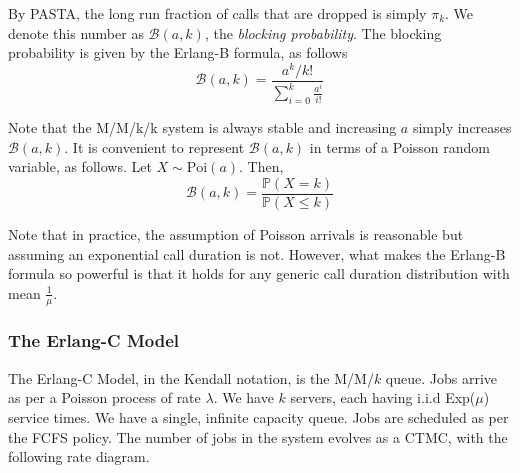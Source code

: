 \documentclass[12pt]{article}
\def\P{\mathbb{P}}
\def\ddfrac#1#2{\displaystyle\frac{\displaystyle #1}{\displaystyle #2}}
\theoremstyle{definition}
\begin{document}
By PASTA, the long run fraction of calls that are dropped is simply $\pi_k$. We denote this number as $\mathcal{B}(a,k)$, the \emph{blocking probability}. The blocking probability is given by the Erlang-B formula, as follows
\[
    \boxed{\mathcal{B}(a,k) = \ddfrac{a^k/k!}{\sum_{i=0}^k \frac{a^i}{i!}}}
\]

Note that the M/M/k/k system is always stable and increasing $a$ simply increases $\mathcal{B}(a,k)$. It is convenient to represent $\mathcal{B}(a,k)$ in terms of a Poisson random variable, as follows. Let $X \sim \text{Poi}(a)$. Then, 
\[
    \mathcal{B}(a,k) = \frac{\P(X = k)}{\P(X \leq k)}
\]

Note that in practice, the assumption of Poisson arrivals is reasonable but assuming an exponential call duration is not. However, what makes the Erlang-B formula so powerful is that it holds for any generic call duration distribution with mean $\frac{1}{\mu}$.

\subsubsection{The Erlang-C Model}

The Erlang-C Model, in the Kendall notation, is the M/M/$k$ queue. Jobs arrive as per a Poisson process of rate $\lambda$. We have $k$ servers, each having i.i.d Exp($\mu$) service times. We have a single, infinite capacity queue. Jobs are scheduled as per the FCFS policy. The number of jobs in the system evolves as a CTMC, with the following rate diagram.


\begin{center}
\end{center}
\end{document}
